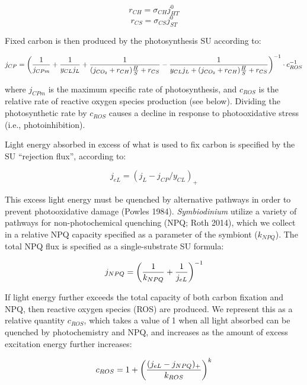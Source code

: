 \documentclass[]{elsarticle} %
\begin{document}
\begin{equation} r_{CH}=\sigma_{CH}j_{HT}^0 \end{equation}\begin{equation} r_{CS}=\sigma_{CS}j_{ST}^0 \end{equation}

Fixed carbon is then produced by the photosynthesis SU according to:

\begin{equation} j_{CP} = \bigg({1 \over j_{CPm}} + {1 \over {y_{CL} j_L }} + {1 \over {(j_{CO_2} + r_{CH}){H \over S} + r_{CS}}} - {1 \over {y_{CL} j_L + (j_{CO_2} + r_{CH}){H \over S} + r_{CS}}}\bigg)^{-1} \cdot c_{ROS}^{-1} \end{equation}

where \(j_{CPm}\) is the maximum specific rate of photosynthesis, and
\(c_{ROS}\) is the relative rate of reactive oxygen species production
(see below). Dividing the photosynthetic rate by \(c_{ROS}\) causes a
decline in response to photooxidative stress (i.e., photoinhibition).

Light energy absorbed in excess of what is used to fix carbon is
specified by the SU ``rejection flux'', according to:

\begin{equation} j_{eL} = (j_L - j_{CP} / y_{CL})_+ \end{equation}

This excess light energy must be quenched by alternative pathways in
order to prevent photooxidative damage (Powles 1984).
\emph{Symbiodinium} utilize a variety of pathways for non-photochemical
quenching (NPQ; Roth 2014), which we collect in a relative NPQ capacity
specified as a parameter of the symbiont (\(k_{NPQ}\)). The total NPQ
flux is specified as a single-substrate SU formula:

\begin{equation} j_{NPQ} = \bigg({1 \over k_{NPQ}} + {1 \over j_{eL}}\bigg)^{-1} \end{equation}

If light energy further exceeds the total capacity of both carbon
fixation and NPQ, then reactive oxygen species (ROS) are produced. We
represent this as a relative quantity \(c_{ROS}\), which takes a value
of 1 when all light absorbed can be quenched by photochemistry and NPQ,
and increases as the amount of excess excitation energy further
increases:

\begin{equation} c_{ROS} = 1 + \bigg({{(j_{eL} - j_{NPQ})_+} \over k_{ROS}}\bigg)^k \end{equation}
\end{document}
